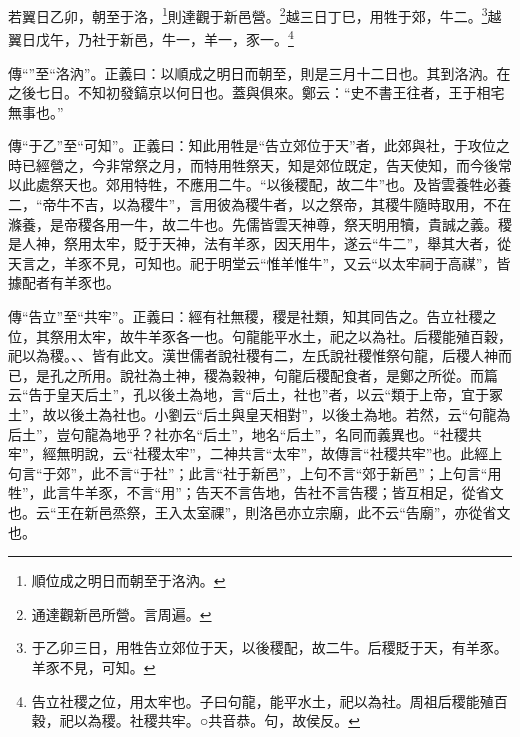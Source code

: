 若翼日乙卯，朝至于洛，\footnote{順位成之明日而朝至于洛汭。}則達觀于新邑營。\footnote{通達觀新邑所營。言周遍。}越三日丁巳，用牲于郊，牛二。\footnote{于乙卯三日，用牲告立郊位于天，以後稷配，故二牛。后稷貶于天，有羊豕。羊豕不見，可知。}越翼日戊午，乃社于新邑，牛一，羊一，豕一。\footnote{告立社稷之位，用太牢也。子曰句龍，能平水土，祀以為社。周祖后稷能殖百穀，祀以為稷。社稷共牢。○共音恭。句，故侯反。}


{\noindent\zhuan{}\fzbyks 傳“”至“洛汭”。正義曰：以順成之明日而朝至，則是三月十二日也。其到洛汭。在之後七日。不知初發鎬京以何日也。蓋與俱來。鄭云：“史不書王往者，王于相宅無事也。” \par}

{\noindent\zhuan{}\fzbyks 傳“于乙”至“可知”。正義曰：知此用牲是“告立郊位于天”者，此郊與社，于攻位之時已經營之，今非常祭之月，而特用牲祭天，知是郊位既定，告天使知，而今後常以此處祭天也。郊用特牲，不應用二牛。“以後稷配，故二牛”也。及皆雲養牲必養二，“帝牛不吉，以為稷牛”，言用彼為稷牛者，以之祭帝，其稷牛隨時取用，不在滌養，是帝稷各用一牛，故二牛也。先儒皆雲天神尊，祭天明用犢，貴誠之義。稷是人神，祭用太牢，貶于天神，法有羊豕，因天用牛，遂云“牛二”，舉其大者，從天言之，羊豕不見，可知也。祀于明堂云“惟羊惟牛”，又云“以太牢祠于高禖”，皆據配者有羊豕也。 \par}

{\noindent\zhuan{}\fzbyks 傳“告立”至“共牢”。正義曰：經有社無稷，稷是社類，知其同告之。告立社稷之位，其祭用太牢，故牛羊豕各一也。句龍能平水土，祀之以為社。后稷能殖百穀，祀以為稷。、、皆有此文。漢世儒者說社稷有二，左氏說社稷惟祭句龍，后稷人神而已，是孔之所用。說社為土神，稷為穀神，句龍后稷配食者，是鄭之所從。而篇云“告于皇天后土”，孔以後土為地，言“后土，社也”者，以云“類于上帝，宜于冢土”，故以後土為社也。小劉云“后土與皇天相對”，以後土為地。若然，云“句龍為后土”，豈句龍為地乎？社亦名“后土”，地名“后土”，名同而義異也。“社稷共牢”，經無明說，云“社稷太牢”，二神共言“太牢”，故傳言“社稷共牢”也。此經上句言“于郊”，此不言“于社”；此言“社于新邑”，上句不言“郊于新邑”；上句言“用牲”，此言牛羊豕，不言“用”；告天不言告地，告社不言告稷；皆互相足，從省文也。云“王在新邑烝祭，王入太室祼”，則洛邑亦立宗廟，此不云“告廟”，亦從省文也。 \par}

